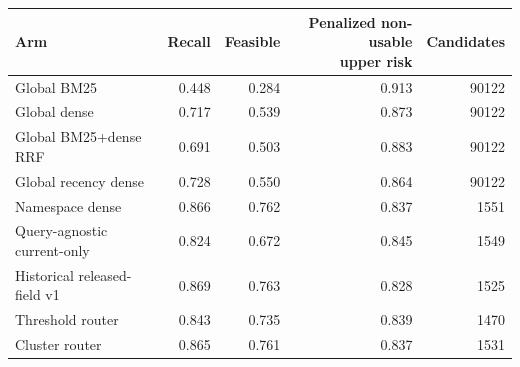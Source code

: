 \begin{tabular}{lrrrr}
\toprule
Arm & Recall & Feasible & \shortstack{Penalized non-usable\\upper risk} & Candidates \\
\midrule
Global BM25 & 0.448 & 0.284 & 0.913 & 90122 \\
Global dense & 0.717 & 0.539 & 0.873 & 90122 \\
Global BM25+dense RRF & 0.691 & 0.503 & 0.883 & 90122 \\
Global recency dense & 0.728 & 0.550 & 0.864 & 90122 \\
Namespace dense & 0.866 & 0.762 & 0.837 & 1551 \\
Query-agnostic current-only & 0.824 & 0.672 & 0.845 & 1549 \\
Historical released-field v1 & 0.869 & 0.763 & 0.828 & 1525 \\
Threshold router & 0.843 & 0.735 & 0.839 & 1470 \\
Cluster router & 0.865 & 0.761 & 0.837 & 1531 \\
\bottomrule
\end{tabular}
